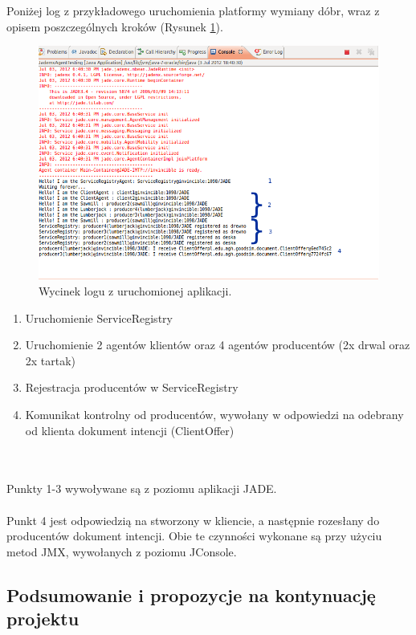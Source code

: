 \documentclass[a4paper,12pt]{article}
\begin{document}
\newpage

Poniżej log z przykładowego uruchomienia platformy wymiany dóbr, wraz z opisem poszczególnych kroków (Rysunek \ref{conf6}).

\begin{figure}[!p]
\begin{center}
\includegraphics[scale=0.5]{gfx/PlatformaWymianyDobr-img10.png}
\caption{Wycinek logu z uruchomionej aplikacji.}
\label{conf6}
\end{center}
\end{figure}

\begin{enumerate}
\item Uruchomienie ServiceRegistry
\item Uruchomienie 2 agentów klientów oraz 4 agentów producentów (2x drwal oraz 2x tartak)
\item Rejestracja producentów w ServiceRegistry
\item Komunikat kontrolny od producentów, wywołany w odpowiedzi na odebrany od klienta dokument intencji (ClientOffer)
\end{enumerate}
\\ \\
Punkty 1-3 wywoływane są z poziomu aplikacji JADE.
\\ \\
Punkt 4 jest odpowiedzią na stworzony w kliencie, a następnie rozesłany do producentów dokument intencji. Obie te czynności wykonane są przy użyciu metod JMX, wywołanych z poziomu JConsole.

\newpage

\subsection{Podsumowanie i propozycje na kontynuację projektu}
\end{document}
